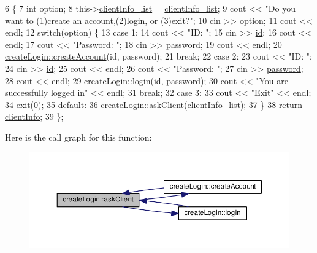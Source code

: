 \begin{DoxyCode}
6 \{
7     \textcolor{keywordtype}{int} option;
8     this->\hyperlink{classcreate_login_a5ea072e63025feb0343c502dbf821d1e}{clientInfo\_list} = \hyperlink{classcreate_login_a5ea072e63025feb0343c502dbf821d1e}{clientInfo\_list};
9     cout << \textcolor{stringliteral}{"Do you want to (1)create an account,(2)login, or (3)exit?"};
10     cin >> option;
11     cout << endl;
12     \textcolor{keywordflow}{switch}(option) \{
13         \textcolor{keywordflow}{case} 1:
14             cout << \textcolor{stringliteral}{"ID: "};
15             cin >> \hyperlink{classcreate_login_a0269d9bbbeaec3c108901f8a4a36665d}{id};
16             cout << endl;
17             cout << \textcolor{stringliteral}{"Password: "};
18             cin >> \hyperlink{classcreate_login_aee8e305c94308da429f2f2e7c6d08370}{password};
19             cout << endl;
20             \hyperlink{classcreate_login_aecf7f6623c2f38e9f75093ac7c8128e7}{createLogin::createAccount}(\textcolor{keywordtype}{id}, password);
21             \textcolor{keywordflow}{break};
22         \textcolor{keywordflow}{case} 2:
23             cout << \textcolor{stringliteral}{"ID: "};
24             cin >> \hyperlink{classcreate_login_a0269d9bbbeaec3c108901f8a4a36665d}{id};
25             cout << endl;
26             cout << \textcolor{stringliteral}{"Password: "};
27             cin >> \hyperlink{classcreate_login_aee8e305c94308da429f2f2e7c6d08370}{password};
28             cout << endl;
29             \hyperlink{classcreate_login_a6012395d12f24689de88dafd5917bf89}{createLogin::login}(\textcolor{keywordtype}{id}, password);
30             cout << \textcolor{stringliteral}{"You are successfully logged in"} << endl;
31             \textcolor{keywordflow}{break};
32         \textcolor{keywordflow}{case} 3:
33             cout << \textcolor{stringliteral}{"Exit"} << endl;
34             exit(0);
35         \textcolor{keywordflow}{default}:
36             \hyperlink{classcreate_login_a564c74834f64e0af3d77a48611e6801b}{createLogin::askClient}(\hyperlink{classcreate_login_a5ea072e63025feb0343c502dbf821d1e}{clientInfo\_list});
37     \}
38     \textcolor{keywordflow}{return} \hyperlink{classcreate_login_a7e6af52371ef69fee03fa9f8b152c9f3}{clientInfo};
39 \};
\end{DoxyCode}


Here is the call graph for this function\+:
\nopagebreak
\begin{figure}[H]
\begin{center}
\leavevmode
\includegraphics[width=350pt]{classcreate_login_a564c74834f64e0af3d77a48611e6801b_cgraph}
\end{center}
\end{figure}




